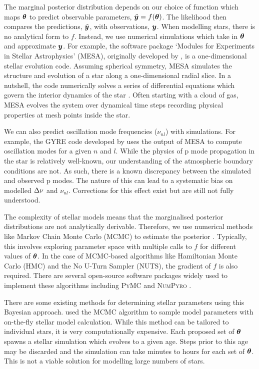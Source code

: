 The marginal posterior distribution depends on our choice of function which maps \(\bm{\theta}\) to predict observable parameters, \(\tilde{\bm{y}} = f(\bm{\theta})\). The likelihood then compares the predictions, \(\tilde{\bm{y}}\), with observations, \(\bm{y}\). When modelling stars, there is no analytical form to \(f\). Instead, we use numerical simulations which take in \(\bm{\theta}\) and approximate \(\bm{y}\). For example, the software package `Modules for Experiments in Stellar Astrophysics' (MESA), originally developed by \citet{Paxton.Bildsten.ea2011}, is a one-dimensional stellar evolution code. Assuming spherical symmetry, MESA simulates the structure and evolution of a star along a one-dimensional radial slice. In a nutshell, the code numerically solves a series of differential equations which govern the interior dynamics of the star \citep[see e.g.][]{Kippenhahn.Weigert.ea2013}. Often starting with a cloud of gas, MESA evolves the system over dynamical time steps recording physical properties at mesh points inside the star.

We can also predict oscillation mode frequencies (\(\nu_{nl}\)) with simulations. For example, the GYRE code developed by \citet{Townsend.Teitler2013} uses the output of MESA to compute oscillation modes for a given \(n\) and \(l\). While the physics of p mode propagation in the star is relatively well-known, our understanding of the atmospheric boundary conditions are not. As such, there is a known discrepancy between the simulated and observed p modes. The nature of this can lead to a systematic bias on modelled \({\Delta\nu}\) and \(\nu_{nl}\). Corrections for this effect exist \citep[e.g.][]{Ball.Gizon2014} but are still not fully understood.

The complexity of stellar models means that the marginalised posterior distributions are not analytically derivable. Therefore, we use numerical methods like Markov Chain Monte Carlo (MCMC) to estimate the posterior \needcite. Typically, this involves exploring parameter space with multiple calls to \(f\) for different values of \(\bm{\theta}\). In the case of MCMC-based algorithms like Hamiltonian Monte Carlo (HMC) and the No U-Turn Sampler (NUTS), the gradient of \(f\) is also required. There are several open-source software packages widely used to implement these algorithms including \textsc{PyMC} \citep{Salvatier.Wiecki.ea2016} and \textsc{NumPyro} \citep{Phan.Pradhan.ea2019}.

There are some existing methods for determining stellar parameters using this Bayesian approach. \citet{Bazot.Bourguignon.ea2008} used the MCMC algorithm to sample model parameters with on-the-fly stellar model calculation. While this method can be tailored to individual stars, it is very computationally expensive. Each proposed set of \(\bm{\theta}\) spawns a stellar simulation which evolves to a given age. Steps prior to this age may be discarded and the simulation can take minutes to hours for each set of \(\bm{\theta}\). This is not a viable solution for modelling large numbers of stars.

